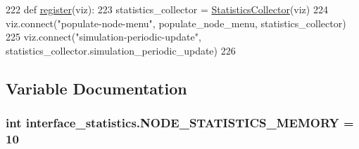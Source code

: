\begin{DoxyCode}
222 \textcolor{keyword}{def }\hyperlink{namespaceinterface__statistics_a357a8afc147af2bf315062dfbf6b6fef}{register}(viz):
223     statistics\_collector = \hyperlink{classinterface__statistics_1_1StatisticsCollector}{StatisticsCollector}(viz)
224     viz.connect(\textcolor{stringliteral}{"populate-node-menu"}, populate\_node\_menu, statistics\_collector)
225     viz.connect(\textcolor{stringliteral}{"simulation-periodic-update"}, statistics\_collector.simulation\_periodic\_update)
226 \end{DoxyCode}


\subsection{Variable Documentation}
\subsubsection[{\texorpdfstring{N\+O\+D\+E\+\_\+\+S\+T\+A\+T\+I\+S\+T\+I\+C\+S\+\_\+\+M\+E\+M\+O\+RY}{NODE_STATISTICS_MEMORY}}]{\setlength{\rightskip}{0pt plus 5cm}int interface\+\_\+statistics.\+N\+O\+D\+E\+\_\+\+S\+T\+A\+T\+I\+S\+T\+I\+C\+S\+\_\+\+M\+E\+M\+O\+RY = 10}\hypertarget{namespaceinterface__statistics_aa2d05f2c71bd7460038005c7d1e1e8ae}{}\label{namespaceinterface__statistics_aa2d05f2c71bd7460038005c7d1e1e8ae}
